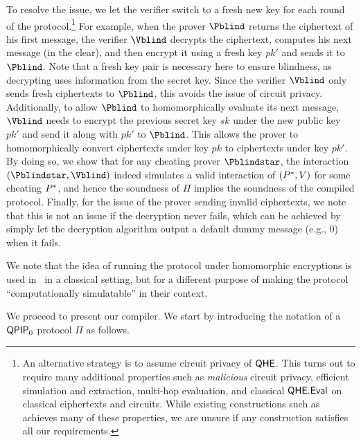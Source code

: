 To resolve the issue, we let the verifier switch to a fresh new key for each round of the protocol.\footnote{
An alternative strategy is to assume circuit privacy of $\mathsf{QHE}$. This turns out to require many additional properties such as \emph{malicious} circuit privacy, efficient simulation and extraction, multi-hop evaluation, and classical $\mathsf{QHE.Eval}$ on classical ciphertexts and circuits. While existing constructions such as \cite{circuit-private-qfhe} achieves many of these properties, we are unsure if any construction satisfies all our requirements.}
For example, when the prover $\Pblind$ returns the ciphertext of his first message, the verifier $\Vblind$ decrypts the ciphertext, computes his next message (in the clear), and then encrypt it using a fresh key $pk'$ and sends it to $\Pblind$.
Note that a fresh key pair is necessary here to ensure blindness, as decrypting uses information from the secret key.
Since the verifier $\Vblind$ only  sends fresh ciphertexts to $\Pblind$, this avoids the issue of circuit privacy. Additionally, to allow $\Pblind$ to homomorphically evaluate its next message, $\Vblind$ needs to encrypt the previous secret key $sk$ under the new public key $pk'$ and send it along with $pk'$ to $\Pblind$. This allows the prover to homomorphically convert ciphertexts under key $pk$ to ciphertexts under key $pk'$. By doing so, we show that for any cheating prover $\Pblindstar$, the interaction $(\Pblindstar, \Vblind)$ indeed simulates a valid interaction of $(P^*, V)$ for some cheating $P^*$, and hence the soundness of $\Pi$ implies the soundness of the compiled protocol. Finally, for the issue of the prover sending invalid ciphertexts, we note that this is not an issue if the decryption never fails, which can be achieved by simply let the decryption algorithm output a default dummy message (e.g., $0$) when it fails. 

We note that the idea of running the protocol under homomorphic encryptions is used in~\cite{KMThesis} in a classical setting, but for a different purpose of making the protocol ``computationally simulatable'' in their context.

We proceed to present our compiler. We start by introducing the notation of a $\operatorname{\mathsf{QPIP}}_0$ protocol $\Pi$ as follows.

